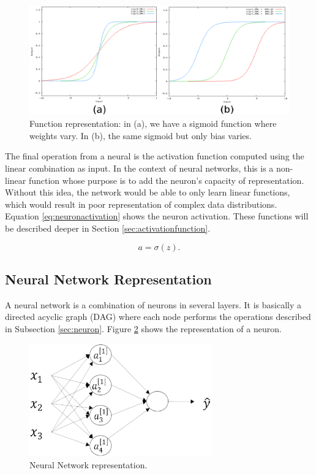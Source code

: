 \begin{figure}[!htbp]
	\centering
	\includegraphics[width=1.0\textwidth]{Cap3/bias.eps}
	\caption{Function representation: in (a), we have a sigmoid function where weights vary. In (b), the same sigmoid but only bias varies.}
	\label{fig:bias}
\end{figure}

The final operation from a neural is the activation function computed using the linear combination as input. In the context of neural networks, this is a non-linear function whose purpose is to add the neuron's capacity of representation. Without this idea, the network would be able to only learn linear functions, which would result in poor representation of complex data distributions. Equation \ref{eq:neuronactivation} shows the neuron activation. These functions will be described deeper in Section \ref{sec:activationfunction}.

\begin{equation}
a = \sigma({z}).
\label{eq:neuronactivation}
\end{equation}


\subsection{Neural Network Representation}

A neural network is a combination of neurons in several layers. It is basically a directed acyclic graph (DAG) where each node performs the operations described in Subsection \ref{sec:neuron}. Figure \ref{fig:neuralnetworkrepresentation} shows the representation of a neuron.

\begin{figure}[!htbp]
	\centering
	\includegraphics[width=0.7\textwidth]{Cap3/neuralnetworkrepresentation.eps}
	\caption{Neural Network representation.}
	\label{fig:neuralnetworkrepresentation}
\end{figure}

